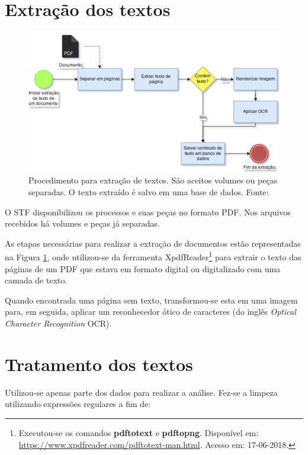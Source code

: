 \section{Extração dos textos}

\begin{figure}[h]
	\centering
    \includegraphics[keepaspectratio=true,scale=0.6]{figuras/extracaoDados}
    \caption[Procedimentos para extração de textos]{Procedimento para extração de textos. São aceitos volumes ou peças separadas. O texto extraído é salvo em uma base de dados. Fonte: }
    \label{fig:extracaoDados}
\end{figure}

O STF disponibilizou os processos e suas peças no formato PDF. Nos arquivos recebidos há volumes e peças já separadas.

As etapas necessárias para realizar a extração de documentos estão representadas na Figura \ref{fig:extracaoDados}, onde utilizou-se da ferramenta XpdfReader\footnote{Executou-se os comandos \textbf{pdftotext} e \textbf{pdftopng}. Disponível em: \url{https://www.xpdfreader.com/pdftotext-man.html}. Acesso em: 17-06-2018.} para extrair o texto das páginas de um PDF que estava em formato digital ou digitalizado com uma camada de texto.

Quando encontrada uma página sem texto, transformou-se esta em uma imagem para, em seguida, aplicar um reconhecedor ótico de caracteres (do inglês \textit{Optical Character Recognition} OCR).

\section{Tratamento dos textos}

Utilizou-se apenas parte dos dados para realizar a análise. Fez-se a limpeza utilizando expressões regulares \cite{goyvaerts_regular_2012} a fim de:

